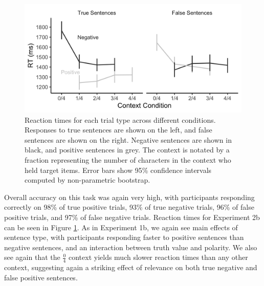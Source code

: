 \documentclass[man, floatsintext, noapacite]{apa6}
\begin{document}
\begin{figure}[t]
\begin{center} 
\includegraphics[width=6in]{figures/experiment2/listener_rts.png}
\caption{\label{fig:exp2_listenerrt} Reaction times for each trial type across different conditions. Responses to true sentences are shown on the left, and false sentences are shown on the right.  Negative sentences are shown in black, and positive sentences in grey.  The context is notated by a fraction representing the number of characters in the context who held target items. Error bars show 95\% confidence intervals computed by non-parametric bootstrap.}
\end{center} 
\end{figure}

Overall accuracy on this task was again very high, with participants responding correctly on 98\% of true positive trials, 93\% of true negative trials, 96\% of false positive trials, and 97\% of false negative trials. Reaction times for Experiment 2b can be seen in Figure \ref{fig:exp2_listenerrt}. As in Experiment 1b, we again see main effects of sentence type, with participants responding faster to positive sentences than negative sentences, and an interaction between truth value and polarity. We also see again that the $\frac{0}{4}$ context yields much slower reaction times than any other context, suggesting again a striking effect of relevance on both true negative and false positive sentences. 
\end{document}
